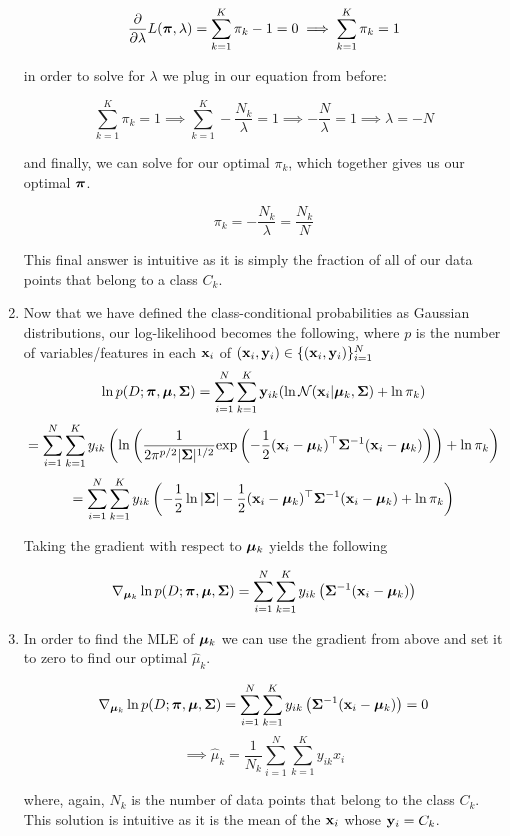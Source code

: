 \documentclass[submit]{harvardml}
\begin{document}
\begin{enumerate}
$$ \frac{\partial}{\partial \lambda} L(\boldsymbol{\pi}, \lambda) = \sum_{k=1}^K \pi_k-1 = 0
  \implies \sum_{k=1}^K \pi_k = 1 $$

in order to solve for $\lambda$ we plug in our equation from before:

$$ \sum_{k=1}^K \pi_k = 1 \implies \sum_{k=1}^K  -\frac{N_k}{\lambda} = 1
\implies -\frac{N}{\lambda} = 1 \implies \lambda = -N $$

and finally, we can solve for our optimal $\pi_k$, which together gives us our optimal
$\boldsymbol{\pi}$.

$$\pi_k = -\frac{N_k}{\lambda} = \frac{N_k}{N}$$

This final answer is intuitive as it is simply the fraction of all of our data points 
that belong to a class $C_k$.

\item 

Now that we have defined the class-conditional probabilities as Gaussian 
distributions, our log-likelihood becomes the following, where $p$ is the number of variables/features in each $\mathbf{x}_i$ of $ (\mathbf{x}_i,\mathbf{y}_i) \in \{(\mathbf{x}_i,\mathbf{y}_i)\}_{i=1}^{N}$
$$\ln p(D; \boldsymbol{\pi}, \boldsymbol{\mu}, \mathbf{\Sigma}) = \sum_{i=1}^N \sum_{k=1}^K \mathbf{y}_{ik}(\ln  \mathcal{N}(\mathbf{x}_i |  \boldsymbol{\mu}_k, \mathbf{\Sigma}) + \ln\pi_k)$$
$$ = \sum_{i=1}^N \sum_{k=1}^K  y_{ik} \left( \ln \left( \frac{1}{2\pi^{p/2} |\mathbf{\Sigma}|^{1/2}} \text{exp}\left(-\frac{1}{2} (\mathbf{x}_i - \boldsymbol{\mu}_k)^\top \mathbf{\Sigma}^{-1} (\mathbf{x}_i - \boldsymbol{\mu}_k)\right)\right) + \ln \pi_k\right) $$
$$ = \sum_{i=1}^N \sum_{k=1}^K  y_{ik} \left(  -\frac{1}{2} \ln |\mathbf{\Sigma}| - \frac{1}{2} (\mathbf{x}_i - \boldsymbol{\mu}_k)^\top \mathbf{\Sigma}^{-1} (\mathbf{x}_i - \boldsymbol{\mu}_k) + \ln \pi_k \right) $$ 

Taking the gradient with respect to $\boldsymbol{\mu}_k$ yields the following

$$ \nabla_{\boldsymbol{\mu}_k}\ln p(D; \boldsymbol{\pi}, \boldsymbol{\mu}, \mathbf{\Sigma}) = \sum_{i=1}^N \sum_{k=1}^K  y_{ik} \left( \mathbf{\Sigma}^{-1} (\mathbf{x}_i - \boldsymbol{\mu}_k) \right)$$

\item 

In order to find the MLE of $\boldsymbol{\mu}_k$ we can use the gradient from above and set it to zero to find
our optimal $\hat{\mu}_k$.

$$ \nabla_{\boldsymbol{\mu}_k}\ln p(D; \boldsymbol{\pi}, \boldsymbol{\mu}, \mathbf{\Sigma}) = \sum_{i=1}^N \sum_{k=1}^K  y_{ik} \left( \mathbf{\Sigma}^{-1} (\mathbf{x}_i - \boldsymbol{\mu}_k) \right) = 0$$
$$ \implies \hat{\mu}_k = \frac{1}{N_k}\sum_{i=1}^N \sum_{k=1}^K  y_{ik} x_i $$

where, again, $N_k$ is the number of data points that belong to the class $C_k$. This 
solution is intuitive as it is the mean of the $\mathbf{x}_i$ whose $\mathbf{y}_i = C_k$.


\end{enumerate}
\end{document}
